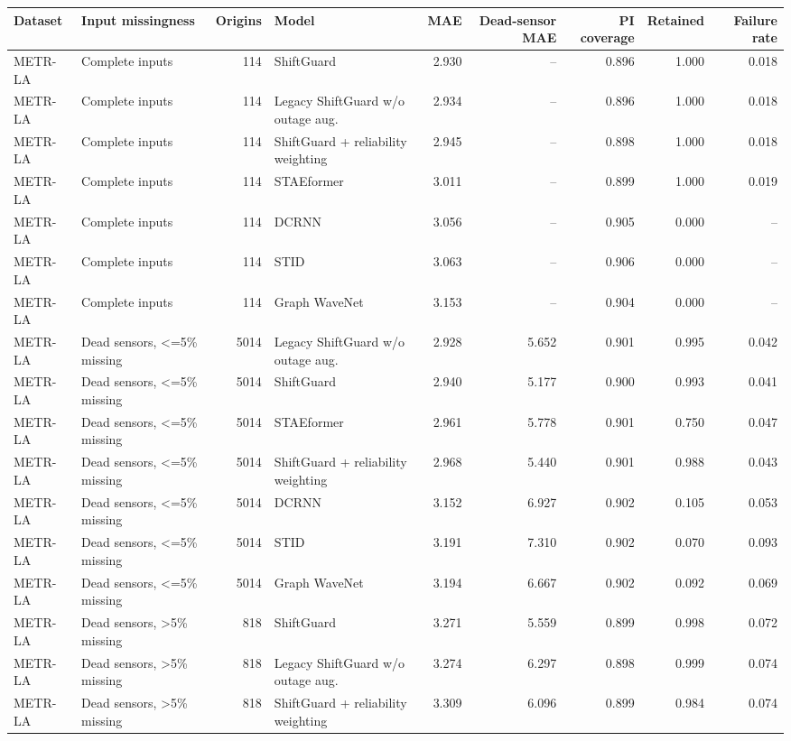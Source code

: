 \begin{tabular}{llrlrrrrr}
\toprule
Dataset & Input missingness & Origins & Model & MAE & Dead-sensor MAE & PI coverage & Retained & Failure rate \\
\midrule
METR-LA & Complete inputs & 114 & ShiftGuard & 2.930 & -- & 0.896 & 1.000 & 0.018 \\
METR-LA & Complete inputs & 114 & Legacy ShiftGuard w/o outage aug. & 2.934 & -- & 0.896 & 1.000 & 0.018 \\
METR-LA & Complete inputs & 114 & ShiftGuard + reliability weighting & 2.945 & -- & 0.898 & 1.000 & 0.018 \\
METR-LA & Complete inputs & 114 & STAEformer & 3.011 & -- & 0.899 & 1.000 & 0.019 \\
METR-LA & Complete inputs & 114 & DCRNN & 3.056 & -- & 0.905 & 0.000 & -- \\
METR-LA & Complete inputs & 114 & STID & 3.063 & -- & 0.906 & 0.000 & -- \\
METR-LA & Complete inputs & 114 & Graph WaveNet & 3.153 & -- & 0.904 & 0.000 & -- \\
METR-LA & Dead sensors, <=5\% missing & 5014 & Legacy ShiftGuard w/o outage aug. & 2.928 & 5.652 & 0.901 & 0.995 & 0.042 \\
METR-LA & Dead sensors, <=5\% missing & 5014 & ShiftGuard & 2.940 & 5.177 & 0.900 & 0.993 & 0.041 \\
METR-LA & Dead sensors, <=5\% missing & 5014 & STAEformer & 2.961 & 5.778 & 0.901 & 0.750 & 0.047 \\
METR-LA & Dead sensors, <=5\% missing & 5014 & ShiftGuard + reliability weighting & 2.968 & 5.440 & 0.901 & 0.988 & 0.043 \\
METR-LA & Dead sensors, <=5\% missing & 5014 & DCRNN & 3.152 & 6.927 & 0.902 & 0.105 & 0.053 \\
METR-LA & Dead sensors, <=5\% missing & 5014 & STID & 3.191 & 7.310 & 0.902 & 0.070 & 0.093 \\
METR-LA & Dead sensors, <=5\% missing & 5014 & Graph WaveNet & 3.194 & 6.667 & 0.902 & 0.092 & 0.069 \\
METR-LA & Dead sensors, >5\% missing & 818 & ShiftGuard & 3.271 & 5.559 & 0.899 & 0.998 & 0.072 \\
METR-LA & Dead sensors, >5\% missing & 818 & Legacy ShiftGuard w/o outage aug. & 3.274 & 6.297 & 0.898 & 0.999 & 0.074 \\
METR-LA & Dead sensors, >5\% missing & 818 & ShiftGuard + reliability weighting & 3.309 & 6.096 & 0.899 & 0.984 & 0.074 \\

\end{tabular}
